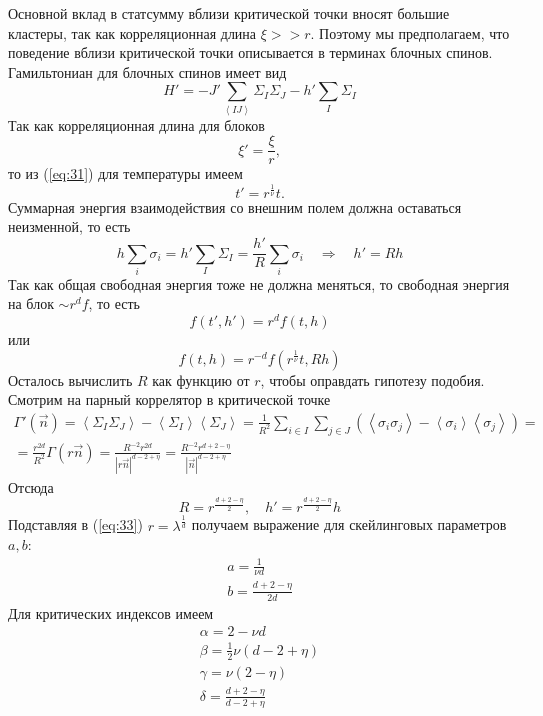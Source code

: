 \documentclass[a4paper,12pt]{article} \usepackage[utf8x]{inputenc} \usepackage[russian]{babel}
\theoremstyle{definition} \newtheorem{corollary}{Corollary}[theorem] \theoremstyle{definition}
\begin{document}
Основной вклад в статсумму вблизи критической точки вносят большие кластеры, так как корреляционная
длина $\xi>>r$. Поэтому мы предполагаем, что поведение вблизи критической точки описывается в
терминах блочных спинов. Гамильтониан для блочных спинов имеет вид
\begin{equation}
  \label{eq:42} H'=-J' \sum_{\left<IJ\right>} \Sigma_I \Sigma_J-h' \sum_I \Sigma_I
\end{equation} Так как корреляционная длина для блоков
\begin{equation}
  \label{eq:43} \xi'=\frac{\xi}{r},
\end{equation} то из (\ref{eq:31}) для температуры имеем
\begin{equation}
  \label{eq:44} t'=r^{\frac{1}{\nu}} t.
\end{equation} Суммарная энергия взаимодействия со внешним полем должна оставаться неизменной, то
есть
\begin{equation}
  \label{eq:45} h\sum_i \sigma_i=h' \sum_I \Sigma_I=\frac{h'}{R}\sum_i
\sigma_i\quad\Longrightarrow\quad h'= Rh
\end{equation} Так как общая свободная энергия тоже не должна меняться, то свободная энергия на блок
$\sim r^d f$, то есть
\begin{equation}
  \label{eq:46} f(t',h')=r^d f(t,h)
\end{equation} или
\begin{equation}
  \label{eq:47} f(t,h)=r^{-d} f(r^{\frac{1}{\nu}} t, Rh)
\end{equation} Осталось вычислить $R$ как функцию от $r$, чтобы оправдать гипотезу подобия. Смотрим
на парный коррелятор в критической точке
\begin{multline}
  \label{eq:48} \Gamma'(\vec n)=\left< \Sigma_I\Sigma_J\right>-\left<
\Sigma_I\right>\left<\Sigma_J\right>=\frac{1}{R^2}\sum_{i\in I}\sum_{j\in J}\left(\left<\sigma_i
\sigma_j\right>-\left<\sigma_i\right>\left<\sigma_j\right>\right) =\\ =
\frac{r^{2d}}{R^2}\Gamma(r\vec n)=\frac{R^{-2}r^{2d}}{\left|r\vec
n\right|^{d-2+\eta}}=\frac{R^{-2}r^{d+2-\eta}}{\left|\vec n\right|^{d-2+\eta}}
\end{multline} Отсюда
\begin{equation}
  \label{eq:49} R=r^{\frac{d+2-\eta}{2}}, \quad h'=r^{\frac{d+2-\eta}{2}}h
\end{equation} Подставляя в (\ref{eq:33}) $r=\lambda^{\frac{1}{d}}$ получаем выражение для
скейлинговых параметров $a,b$:
\begin{eqnarray}
  \label{eq:50} a=\frac{1}{\nu d}\\ b=\frac{d+2-\eta}{2d}
\end{eqnarray} Для критических индексов имеем
\begin{eqnarray}
  \label{eq:51} \alpha=2-\nu d\\ \beta=\frac{1}{2}\nu (d-2+\eta)\\ \gamma=\nu (2-\eta)\\
\delta=\frac{d+2-\eta}{d-2+\eta}
\end{eqnarray}
\end{document}
